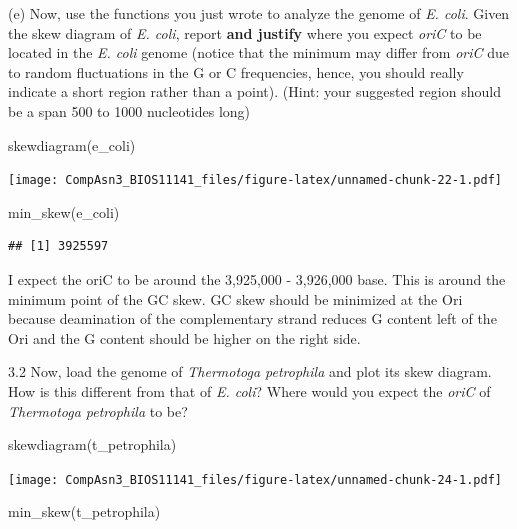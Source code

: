 \documentclass[
]{article}
\newenvironment{Shaded}{\begin{snugshade}}{\end{snugshade}}
\newcommand{\FunctionTok}[1]{\textcolor[rgb]{0.00,0.00,0.00}{#1}}
\newcommand{\NormalTok}[1]{#1}
\begin{document}
(e) Now, use the functions you just wrote to analyze the genome of
\emph{E. coli}. Given the skew diagram of \emph{E. coli}, report
\textbf{and justify} where you expect \emph{oriC} to be located in the
\emph{E. coli} genome (notice that the minimum may differ from
\emph{oriC} due to random fluctuations in the G or C frequencies, hence,
you should really indicate a short region rather than a point). (Hint:
your suggested region should be a span 500 to 1000 nucleotides long)
\span 

\begin{Shaded}
\begin{Highlighting}[]
\FunctionTok{skewdiagram}\NormalTok{(e\_coli)}
\end{Highlighting}
\end{Shaded}

\texttt{[image: CompAsn3\_BIOS11141\_files/figure-latex/unnamed-chunk-22-1.pdf]}

\begin{Shaded}
\begin{Highlighting}[]
\FunctionTok{min\_skew}\NormalTok{(e\_coli)}
\end{Highlighting}
\end{Shaded}

\begin{verbatim}
## [1] 3925597
\end{verbatim}

{ I expect the oriC to be around the 3,925,000 - 3,926,000 base. This is
around the minimum point of the GC skew. GC skew should be minimized at
the Ori because deamination of the complementary strand reduces G
content left of the Ori and the G content should be higher on the right
side. }

3.2 Now, load the genome of \emph{Thermotoga petrophila} and plot its
skew diagram. How is this different from that of \emph{E. coli}? Where
would you expect the \emph{oriC} of \emph{Thermotoga petrophila} to be?
\span

\begin{Shaded}
\begin{Highlighting}[]
\FunctionTok{skewdiagram}\NormalTok{(t\_petrophila)}
\end{Highlighting}
\end{Shaded}

\texttt{[image: CompAsn3\_BIOS11141\_files/figure-latex/unnamed-chunk-24-1.pdf]}

\begin{Shaded}
\begin{Highlighting}[]
\FunctionTok{min\_skew}\NormalTok{(t\_petrophila)}
\end{Highlighting}
\end{Shaded}
\end{document}
